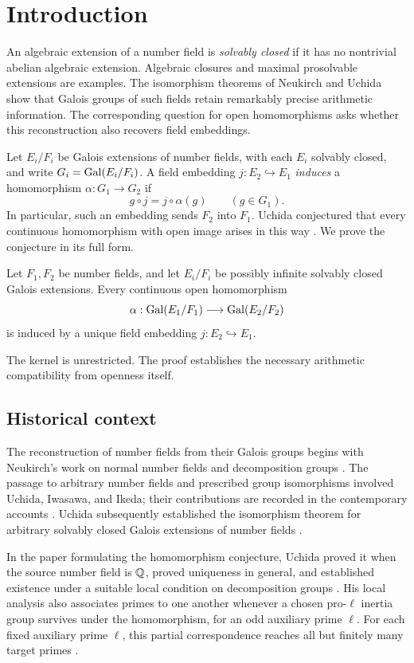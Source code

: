\section{Introduction}\label{sec:introduction}

An algebraic extension of a number field is \emph{solvably closed} if it has no nontrivial abelian algebraic extension. Algebraic closures and maximal prosolvable extensions are examples. The isomorphism theorems of Neukirch and Uchida show that Galois groups of such fields retain remarkably precise arithmetic information. The corresponding question for open homomorphisms asks whether this reconstruction also recovers field embeddings.

Let $E_i/F_i$ be Galois extensions of number fields, with each $E_i$ solvably closed, and write $G_i=\operatorname{Gal}(E_i/F_i)$. A field embedding $j:E_2\hookrightarrow E_1$ \emph{induces} a homomorphism $\alpha:G_1\to G_2$ if
\[
 g\circ j=j\circ\alpha(g)\qquad(g\in G_1).
\]
In particular, such an embedding sends $F_2$ into $F_1$. Uchida conjectured that every continuous homomorphism with open image arises in this way \cite[p.~595]{uchida1981}. We prove the conjecture in its full form.

\begin{theorem}\label{thm:main}
Let $F_1,F_2$ be number fields, and let $E_i/F_i$ be possibly infinite solvably closed Galois extensions. Every continuous open homomorphism
\[
 \alpha:\operatorname{Gal}(E_1/F_1)\longrightarrow\operatorname{Gal}(E_2/F_2)
\]
is induced by a unique field embedding $j:E_2\hookrightarrow E_1$.
\end{theorem}

The kernel is unrestricted. The proof establishes the necessary arithmetic compatibility from openness itself.

\subsection{Historical context}
The reconstruction of number fields from their Galois groups begins with Neukirch's work on normal number fields and decomposition groups \cite{neukirch1969a,neukirch1969b}. The passage to arbitrary number fields and prescribed group isomorphisms involved Uchida, Iwasawa, and Ikeda; their contributions are recorded in the contemporary accounts \cite{uchida1976,neukirch1977}. Uchida subsequently established the isomorphism theorem for arbitrary solvably closed Galois extensions of number fields \cite{uchida1979}.

In the paper formulating the homomorphism conjecture, Uchida proved it when the source number field is $\mathbb Q$, proved uniqueness in general, and established existence under a suitable local condition on decomposition groups \cite[Theorem~1, Proposition~2, and Theorem~2]{uchida1981}. His local analysis also associates primes to one another whenever a chosen pro-$\ell$ inertia group survives under the homomorphism, for an odd auxiliary prime $\ell$. For each fixed auxiliary prime $\ell$, this partial correspondence reaches all but finitely many target primes \cite[Proposition~1]{uchida1981}.

